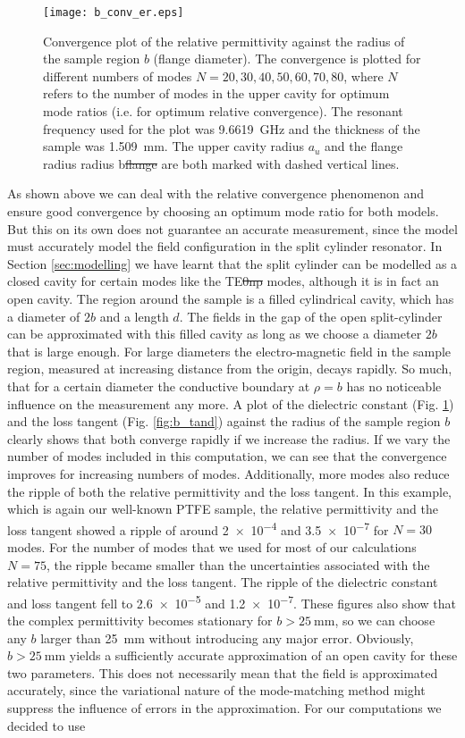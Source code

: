 \begin{figure}
\centering
\texttt{[image: b\_conv\_er.eps]}
\caption{Convergence plot of the relative permittivity \er{} against the radius of the sample region $b$ (flange diameter). The convergence is plotted for different numbers of modes $N=20,30,40,50,60,70,80$, where $N$ refers to the number of modes in the upper cavity for optimum mode ratios (i.e. for optimum relative convergence). The resonant frequency used for the plot was \SI{9.6619}{\giga\hertz} and the thickness of the sample was \SI{1.509}{\milli\meter}. The upper cavity radius $a_u$ and the flange radius radius b\st{flange} are both marked with dashed vertical lines.}\label{fig:b_er}
\end{figure}

As shown above we can deal with the relative convergence phenomenon and ensure good convergence by choosing an optimum mode ratio for both models. But this on its own does not guarantee an accurate measurement, since the model must accurately model the field configuration in the split cylinder resonator. In Section \ref{sec:modelling} we have learnt that the split cylinder can be modelled as a closed cavity for certain modes like the TE\st{0np} modes, although it is in fact an open cavity. The region around the sample is a filled cylindrical cavity, which has a diameter of $2b$ and a length $d$. The fields in the gap of the open split-cylinder can be approximated with this filled cavity as long as we choose a diameter $2b$ that is large enough. For large diameters the electro-magnetic field in the sample region, measured at increasing distance from the origin, decays rapidly. So much, that for a certain diameter the conductive boundary at $\rho=b$ has no noticeable influence on the measurement any more. A plot of the dielectric constant (Fig. \ref{fig:b_er}) and the loss tangent (Fig. \ref{fig:b_tand}) against the radius of the sample region $b$ clearly shows that both converge rapidly if we increase the radius. If we vary the number of modes included in this computation, we can see that the convergence improves for increasing numbers of modes. Additionally, more modes also reduce the ripple of both the relative permittivity and the loss tangent. In this example, which is again our well-known PTFE sample, the relative permittivity and the loss tangent showed a ripple of around \num{2e-4} and \num{3.5e-7} for $N=30$ modes. For the number of modes that we used for most of our calculations $N=75$, the ripple became smaller than the uncertainties associated with the relative permittivity and the loss tangent. The ripple of the dielectric constant and loss tangent fell to \num{2.6e-5} and \num{1.2e-7}. These figures also show that the complex permittivity becomes stationary for $b>\SI{25}{\milli\meter}$, so we can choose any $b$ larger than \SI{25}{\milli\meter} without introducing any major error. Obviously, $b>\SI{25}{\milli\meter}$ yields a sufficiently accurate approximation of an open cavity for these two parameters. This does not necessarily mean that the field is approximated accurately, since the variational nature of the mode-matching method might suppress the influence of errors in the approximation. For our computations we decided to use 